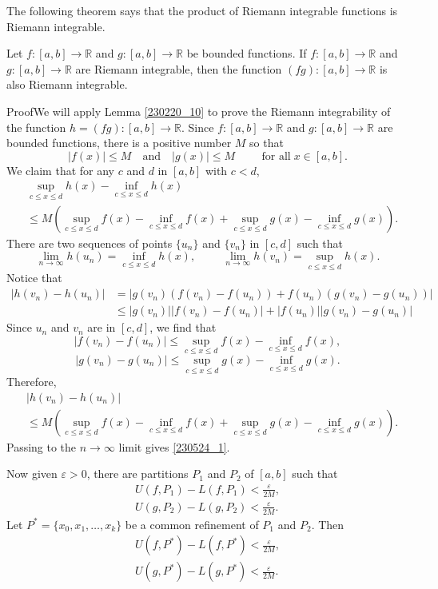  The following theorem says that the product of Riemann integrable functions is Riemann integrable.
\begin{theorem}{}
Let $f:[a,b]\to\mathbb{R}$ and  $g:[a,b]\to\mathbb{R}$ be bounded functions. If  $f:[a,b]\to\mathbb{R}$ and  $g:[a,b]\to\mathbb{R}$ are Riemann integrable, then the function  $(fg):[a,b]\to\mathbb{R}$ is also Riemann integrable.
\end{theorem}
\begin{myproof}{Proof}We will apply Lemma \ref{230220_10} to prove the Riemann integrability of the function  $h=(fg):[a,b]\to\mathbb{R}$.
Since  $f:[a,b]\to\mathbb{R}$ and  $g:[a,b]\to\mathbb{R}$ are bounded functions, there is a positive number $M$ so that 
\[|f(x)|\leq M\quad\text{and}\quad|g(x)|\leq M\hspace{1cm}\text{for all}\;x\in [a,b].\]
We claim that for any $c$ and $d$ in $[a,b]$ with $c<d$,
\begin{equation}\label{230524_1}\begin{split}&\sup_{c\leq x\leq d}h(x)-\inf_{c\leq x\leq d}h(x)\\&\leq M\left(\sup_{c\leq x\leq d}f(x)-\inf_{c\leq x\leq d}f(x)+\sup_{c\leq x\leq d}g(x)-\inf_{c\leq x\leq d}g(x)\right).\end{split}\end{equation}\bp
 There are two sequences of points $\{u_n\}$ and $\{v_n\}$ in $[c,d]$ such that
\[\lim_{n\to\infty}h(u_n)=\inf_{c\leq x\leq d}h(x),\hspace{1cm}\lim_{n\to\infty}h(v_n)=\sup_{c\leq x\leq d}h(x).\] 
Notice that
\begin{align*}
|h(v_n)-h(u_n)|&=|g(v_n)(f(v_n)-f(u_n))+f(u_n)(g(v_n)-g(u_n))|\\
&\leq |g(v_n)||f(v_n)-f(u_n)|+|f(u_n)||g(v_n)-g(u_n)|\end{align*}  Since $u_n$ and $v_n$ are in $[c,d]$, we find that
\[|f(v_n)-f(u_n)|\leq \sup_{c\leq  x\leq d}f(x)-\inf_{c\leq x\leq d}f(x),\]
\[|g(v_n)-g(u_n)|\leq \sup_{c\leq  x\leq d}g(x)-\inf_{c\leq x\leq d}g(x).\]
Therefore,
\begin{align*}
&|h(v_n)-h(u_n)|\\&\leq M\left(\sup_{c\leq  x\leq d}f(x)-\inf_{c\leq x\leq d}f(x)+\sup_{c\leq x\leq d}g(x)-\inf_{c\leq x\leq d}g(x)\right).
\end{align*}Passing to the $n\to\infty$ limit gives \eqref{230524_1}.

Now given $\varepsilon>0$, there are partitions $P_1$ and $P_2$ of $[a,b]$ such that
\begin{gather*}U(f,P_1)-L(f,P_1)<\frac{\varepsilon}{2M},\\
U(g,P_2)-L(g,P_2)<\frac{\varepsilon}{2M}.\end{gather*}
Let $P^*=\{x_0, x_1, \ldots, x_k\}$ be  a common refinement of $P_1$ and $P_2$. Then
\begin{gather*}
U(f,P^*)-L(f,P^*)<\frac{\varepsilon}{2M},\\
U(g,P^*)-L(g,P^*)<\frac{\varepsilon}{2M}.\end{gather*}



\end{myproof}
